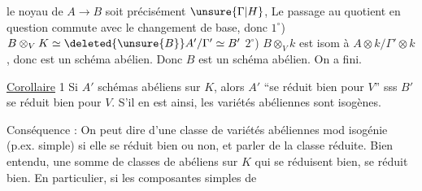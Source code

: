 le noyau de $A\longrightarrow B$ soit précisément $\unsure{\Gamma|H}$,
 Le passage au quotient en question
commute avec le changement de base, donc
$1^\circ$) $B\otimes_V K\simeq\deleted{\unsure{B}}A'/\Gamma'\simeq B'$ \qquad $2^\circ$) $B\otimes_V k$ est 
isom à  $A\otimes k/\Gamma'\otimes k$, donc est un
schéma abélien. Donc $B$ est un
schéma abélien. On a fini.

\uline{Corollaire} 1  Si $A'$ 
schémas abéliens  sur $K$, alors $A'$ ``se
réduit bien pour $V$'' sss $B'$ se réduit
bien pour $V$. S'il en est ainsi, les variétés
 abéliennes  sont isogènes.

 Conséquence : On peut dire d'une
classe de variétés abéliennes mod isogénie
(p.ex. simple) si elle se réduit bien ou
non, et  parler de la
 classe réduite. Bien
entendu, une somme de classes
de  abéliens sur $K$ qui se
réduisent bien, se réduit bien. En
particulier, si les composantes simples de
